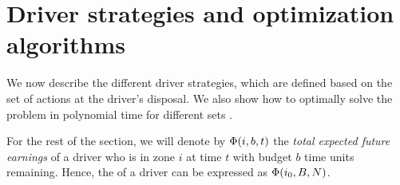 
\section{Driver strategies and optimization algorithms}
\label{sec:driver_strategies}
We now describe the different driver strategies, which are defined based on the
set of actions {\actionsset} at the driver's disposal. We also show how to 
optimally solve
the {\originalproblem} problem in polynomial time for different sets {\actionsset}.

For the rest of the section, we will denote by 
$\Phi({i,b,t})$ the \emph{total expected future earnings} of a driver who is in zone $i$ at time $t$ with 
budget $b$ time units remaining. Hence,
the {\totalexpectedearnings} of a driver can be expressed as $\Phi({{i_0},B,N})$.


